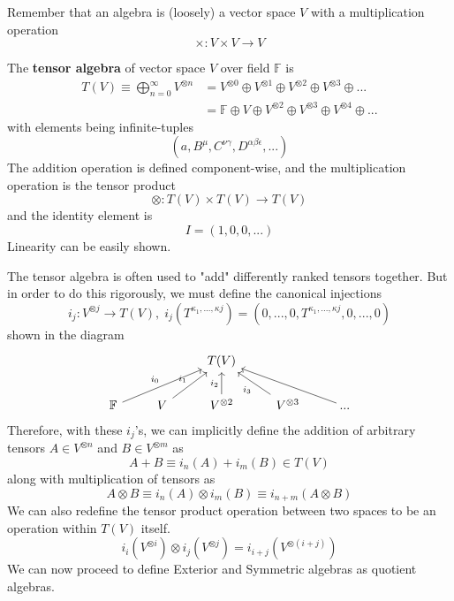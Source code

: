 \documentclass{article}
\begin{document}
  Remember that an algebra is (loosely) a vector space $V$ with a multiplication operation
  \begin{equation}
    \times: V \times V \longrightarrow V
  \end{equation}

  \begin{definition}
    The \textbf{tensor algebra} of vector space $V$ over field $\mathbb{F}$ is 
    \begin{align*}
      T(V) \equiv \bigoplus_{n = 0}^{\infty} V^{\otimes n} & = V^{\otimes 0} \oplus V^{\otimes 1} \oplus V^{\otimes 2} \oplus V^{\otimes 3} \oplus ... \\
      & = \mathbb{F} \oplus V \oplus V^{\otimes 2} \oplus V^{\otimes 3} \oplus V^{\otimes 4} \oplus ...
    \end{align*}
    with elements being infinite-tuples
    \begin{equation}
      (a, B^\mu, C^{\nu \gamma}, D^{\alpha \beta \epsilon}, ...)
    \end{equation}
    The addition operation is defined component-wise, and the multiplication operation is the tensor product 
    \begin{equation}
      \otimes: T(V) \times T(V) \longrightarrow T(V)
    \end{equation}
    and the identity element is
    \begin{equation}
      I = (1, 0, 0, ...)
    \end{equation}
    Linearity can be easily shown. 
  \end{definition}

  The tensor algebra is often used to "add" differently ranked tensors together. But in order to do this rigorously, we must define the canonical injections
  \begin{equation}
    i_j: V^{\otimes j} \longrightarrow T(V), \; i_j (T^{\kappa_1, ..., \kappa j}) = (0, ...,0, T^{\kappa_1, ..., \kappa j}, 0, ..., 0) 
  \end{equation}
  shown in the diagram
  \[\begin{tikzcd}
      & & T(V) & & \\
      \mathbb{F} \arrow{urr}{i_0} & V \arrow{ur}{i_1} & V^{\otimes 2} \arrow{u}{i_2} & V^{\otimes 3} \arrow{ul}{i_3} & ... \arrow{ull}
  \end{tikzcd}\]
  Therefore, with these $i_j$'s, we can implicitly define the addition of arbitrary tensors $A \in V^{\otimes n}$ and $B \in V^{\otimes m}$ as 
  \begin{equation}
    A + B \equiv i_n (A) + i_m (B) \in T(V)
  \end{equation}
  along with multiplication of tensors as
  \begin{equation}
    A \otimes B \equiv i_n(A) \otimes i_m(B) \equiv i_{n+m} (A \otimes B)
  \end{equation}
  We can also redefine the tensor product operation between two spaces to be an operation within $T(V)$ itself. 
  \begin{equation}
    i_i(V^{\otimes i}) \otimes i_j( V^{\otimes j}) = i_{i+j} (V^{\otimes (i+j)})
  \end{equation}
  We can now proceed to define Exterior and Symmetric algebras as quotient algebras. 
\end{document}
